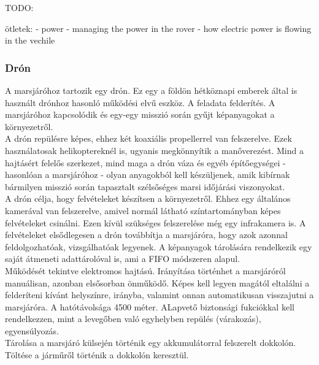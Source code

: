 \documentclass[12pt]{report}
\begin{document}
TODO:

ötletek:
- power
  - managing the power in the rover
  - how electric power is flowing in the vechile

\subsubsection{Drón}
A marsjáróhoz tartozik egy drón. Ez egy a földön hétköznapi emberek által is használt drónhoz hasonló működési elvű eszköz. A feladata felderítés. A marsjáróhoz kapcsolódik és egy-egy misszió során gyűjt képanyagokat a környezetről.\\
A drón repülésre képes, ehhez két koaxiális propellerrel van felszerelve. Ezek használatosak helikoptereknél is, ugyanis megkönnyítik a manőverezést. Mind a hajtásért felelős szerkezet, mind maga a drón váza és egyéb építőegységei - hasonlóan a marsjáróhoz - olyan anyagokból kell készüljenek, amik kibírnak bármilyen misszió során tapasztalt szélsőséges marsi időjárási viszonyokat.\\
A drón célja, hogy felvételeket készítsen a környezetről. Ehhez egy általános kamerával van felszerelve, amivel normál látható színtartományban képes felvételeket csinálni. Ezen kívül szükséges felszerelése még egy infrakamera is. A felvételeket elsődlegesen a drón továbbítja a marsjáróra, hogy azok azonnal feldolgozhatóak, vizsgálhatóak legyenek. A képanyagok tárolására rendelkezik egy saját átmeneti adattárolóval is, ami a FIFO módszeren alapul.\\
Működését tekintve elektromos hajtású. Irányítása történhet a marsjáróról manuálisan, azonban elsősorban önműködő. Képes kell legyen magától eltalálni a felderíteni kívánt helyszínre, irányba, valamint onnan automatikusan visszajutni a marsjáróra. A hatótávolsága 4500 méter. ALapvető biztonsági fukciókkal kell rendelkezzen, mint a levegőben való egyhelyben repülés (várakozás), egyensúlyozás.\\
Tárolása a marsjáró külsején történik egy akkumulátorral felszerelt dokkolón. Töltése a járműről történik a dokkolón keresztül. 
\end{document}

